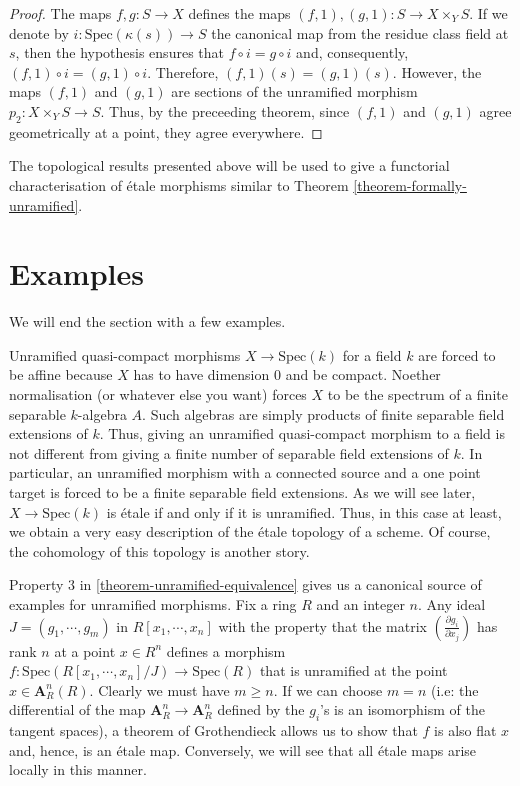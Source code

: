 \begin{proof}
The maps $f,g:S \to X$ defines the maps $(f,1),(g,1):S \to X \times_Y S$. If
we denote by $i:\text{Spec}(\kappa(s)) \to S$ the canonical map from the residue
class field at $s$, then the hypothesis ensures that $f\circ i = g\circ i$
and, consequently, $(f,1)\circ i = (g,1) \circ i$. Therefore,
$(f,1)(s) = (g,1)(s)$. However, the maps $(f,1)$ and $(g,1)$ are sections of
the unramified morphism $p_2:X\times_Y S \to S$. Thus, by the preceeding
theorem, since $(f,1)$ and $(g,1)$ agree geometrically at a point, they agree
everywhere.
\end{proof}

\noindent
The topological results presented above will be used to give a functorial
characterisation of \'etale morphisms similar to Theorem
\ref{theorem-formally-unramified}.

\section{Examples}
\label{section-examples}

\noindent
We will end the section with a few examples.

\begin{example}
\label{example-etale-field-extensions}
Unramified quasi-compact morphisms $X \to \text{Spec}(k)$ for a field $k$ are 
forced
to be affine because $X$ has to have dimension $0$ and be compact. Noether
normalisation (or whatever else you want) forces $X$ to be the spectrum of a
finite separable $k$-algebra $A$. Such algebras are simply products of finite
separable field extensions of $k$. Thus, giving an unramified quasi-compact
morphism to a field is not different from giving a finite number of separable
field extensions of $k$. In particular, an unramified morphism with a
connected source and a one point target is forced to be a finite separable
field extensions. As we will see later, $X \to \text{Spec}(k)$ is \'etale if and
only if it is unramified. Thus, in this case at least, we obtain a very easy
description of the \'etale topology of a scheme. Of course, the cohomology of
this topology is another story.
\end{example}

\begin{example}
\label{example-standard-etale}
Property $3$ in \ref{theorem-unramified-equivalence} 
gives us a canonical source of
examples for unramified morphisms. Fix a ring $R$ and an integer $n$. Any
ideal $J = (g_1,\cdots,g_m)$ in $R[x_1,\cdots,x_n]$ with the property that the
matrix $(\frac{\partial g_i}{\partial x_j})$ has rank $n$ at a point
$x \in R^n$ defines a morphism $f:\text{Spec}(R[x_1,\cdots,x_n]/J) \to 
\text{Spec}(R)$
that is unramified at the point $x \in \mathbf{A}^n_R(R)$. Clearly we must have
$m \geq n$. If we can choose $m = n$ (i.e: the differential of the map
$\mathbf{A}^n_R \to \mathbf{A}^n_R$ defined by the $g_i$'s is an isomorphism of 
the tangent
spaces), a theorem of Grothendieck allows us to show that $f$ is also flat
$x$ and, hence, is an \'etale map. Conversely, we will see that all \'etale
maps arise locally in this manner.
\end{example}

